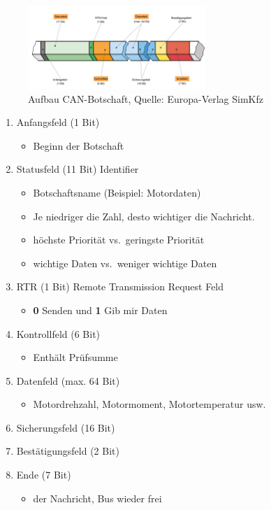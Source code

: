\begin{figure}[!ht]%
\centering
\includegraphics[width=0.6\textwidth]{images/CAN/Aufbau-CAN-Botschaft.png}
\caption{Aufbau CAN-Botschaft, Quelle: Europa-Verlag SimKfz}
\end{figure}

\begin{enumerate}
\item
  Anfangsfeld (1 Bit)

  \begin{itemize}
  \item
    Beginn der Botschaft
  \end{itemize}
\item
  Statusfeld (11 Bit) Identifier

  \begin{itemize}
  \item
    Botschaftsname (Beispiel: Motordaten)
  \item
    Je niedriger die Zahl, desto wichtiger die Nachricht.
  \item
    höchste Priorität vs.~geringste Priorität
  \item
    wichtige Daten vs.~weniger wichtige Daten
  \end{itemize}
\item
  RTR (1 Bit) Remote Transmission Request Feld

  \begin{itemize}
  \item
    \textbf{0} Senden und \textbf{1} Gib mir Daten
  \end{itemize}
\item
  Kontrollfeld (6 Bit)

  \begin{itemize}
  \item
    Enthält Prüfsumme
  \end{itemize}
\item
  Datenfeld (max. 64 Bit)

  \begin{itemize}
  \item
    Motordrehzahl, Motormoment, Motortemperatur usw.
  \end{itemize}
\item
  Sicherungsfeld (16 Bit)
\item
  Bestätigungsfeld (2 Bit)
\item
  Ende (7 Bit)

  \begin{itemize}
  \item
    der Nachricht, Bus wieder frei
  \end{itemize}
\end{enumerate}

